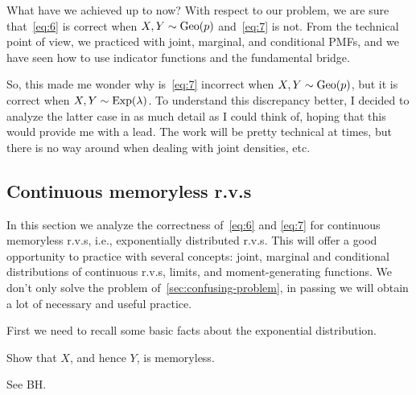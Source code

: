 \documentclass[a4paper,12pt]{article}
\begin{document}
What have we achieved up to now? With respect to our problem, we are sure that~\eqref{eq:6} is correct when $X, Y \sim \mathrm{Geo}(p)$ and~\cref{eq:7} is not.
From the technical point of view, we practiced with joint, marginal, and conditional PMFs, and we have seen how to use indicator functions and the fundamental bridge.

So, this made me wonder why is~\eqref{eq:7} incorrect when $X, Y\sim\mathrm{Geo}(p)$, but it is correct when $X,Y\sim\mathrm{Exp}(\lambda)$.
To understand this discrepancy better, I decided to analyze the latter case in as much detail as I could think of, hoping that this would  provide me with a lead.
The work will be pretty technical at times, but there is no way around when dealing with joint densities, etc.



\subsection{Continuous memoryless r.v.s}
\label{sec:exerc-expon-distr}

In this section we analyze the correctness of~\cref{eq:6} and \cref{eq:7} for continuous memoryless r.v.s, i.e., exponentially distributed r.v.s.
This will offer a good opportunity to practice with several concepts: joint, marginal and conditional distributions of continuous r.v.s,  limits, and moment-generating functions.
We don't only solve the problem of~\cref{sec:confusing-problem}, in passing we will obtain a lot of necessary and useful practice.

First we need to recall some basic facts about the exponential distribution.

\begin{exercise}
Show that $X$, and hence $Y$, is memoryless.
\begin{solution}
  See BH.
\end{solution}
\end{exercise}
\end{document}
